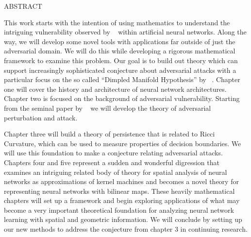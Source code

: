 %


\addchaptertocentry{\abstractname} %

\begin{center}
\MakeUppercase{Abstract}\\ \bigskip
\end{center}

This work starts with the intention of using mathematics to understand
the intriguing vulnerability observed by ~\citet{szegedy2013} within
artificial neural networks. Along the way, we will develop some novel
tools with applications far outside of just the adversarial domain. We
will do this while developing a rigorous mathematical framework to
examine this problem. Our goal is to build out theory which
can support increasingly sophisticated conjecture about adversarial
attacks with a particular focus on the so called ``Dimpled Manifold
Hypothesis'' by ~\citet{shamir2021dimpled}. Chapter one will cover the history and architecture of neural network
architectures. Chapter two is focused on the background
of adversarial vulnerability. Starting from the seminal paper by
~\citet{szegedy2013} we will develop the theory of adversarial
perturbation and attack.

Chapter three will build a theory of persistence
that is related to Ricci Curvature, which can be used to measure
properties of decision boundaries. We will use this foundation to make
a conjecture relating adversarial attacks. Chapters four and five represent a sudden and wonderful digression
that examines an intriguing related body of theory for spatial
analysis of neural networks as approximations of kernel machines and
becomes a novel theory for representing neural networks with bilinear
maps. These heavily mathematical chapters will set up a framework
and begin exploring applications of what may become a very important
theoretical foundation for analyzing neural network learning with
spatial and geometric information. We will
conclude by setting up our new methods to address the conjecture from
chapter 3 in continuing research. 


